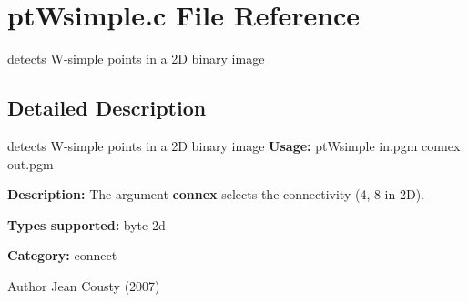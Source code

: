 \section{ptWsimple.c File Reference}
\label{ptWsimple_8c}


detects W-\/simple points in a 2D binary image  




\subsection{Detailed Description}
detects W-\/simple points in a 2D binary image {\bfseries Usage:} ptWsimple in.pgm connex out.pgm

{\bfseries Description:} The argument {\bfseries connex} selects the connectivity (4, 8 in 2D).

{\bfseries Types supported:} byte 2d

{\bfseries Category:} connect

\begin{DoxyAuthor}{Author}
Jean Cousty (2007) 
\end{DoxyAuthor}
